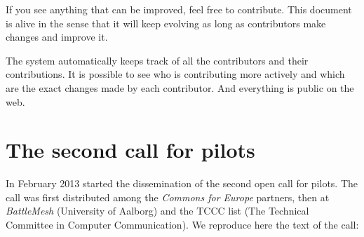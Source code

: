 \documentclass[draftclsnofoot,12pt,journal,onecolumn]{IEEEtran}
\begin{document}
If you see anything that can be improved, feel free to contribute.
This document is alive in the sense that it will keep evolving as long as contributors make changes and improve it.

The system automatically keeps track of all the contributors and their contributions. 
It is possible to see who is contributing more actively and which are the exact changes made by each contributor.
And everything is public on the web.

\section{The second call for pilots}
\label{sec:cfp}

In February 2013 started the dissemination of the second open call for pilots.
The call was first distributed among the \emph{Commons for Europe} partners, then at \emph{BattleMesh} (University of Aalborg) and the TCCC list (The Technical Committee in Computer Communication).
We reproduce here the text of the call:
\end{document}
